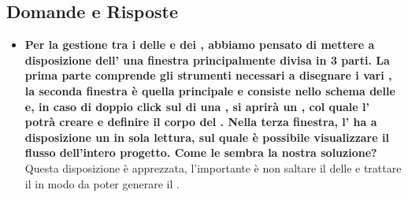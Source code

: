 	  \subsection{Domande e Risposte}
	   \begin{itemize}
	   
	   	   	\item 
	   		\textbf{Per la gestione tra i  delle  e dei , abbiamo pensato di mettere a disposizione dell' una finestra principalmente divisa in 3 parti. La prima parte comprende gli strumenti necessari a disegnare i vari , la seconda finestra è quella principale e consiste nello schema delle  e, in caso di doppio click sul  di una , si aprirà un , col quale l' potrà creare e definire il corpo del . Nella terza finestra, l' ha a disposizione un  in sola lettura, sul quale è possibile visualizzare il flusso dell'intero progetto. Come le sembra la nostra soluzione? } \\
	    	\justifying     		
Questa disposizione è apprezzata, l'importante è non saltare il  delle  e trattare il  in modo da poter generare il .\\


\end{itemize}
